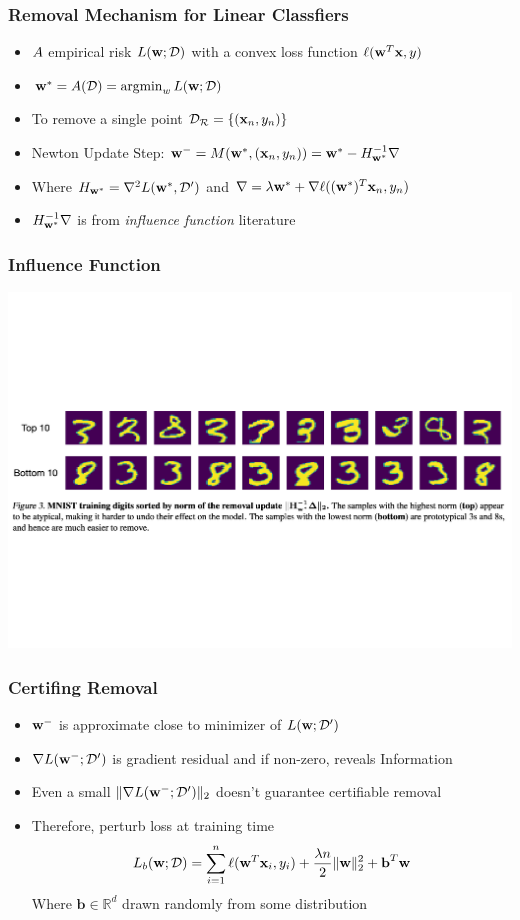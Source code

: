 \documentclass[pdf]{beamer}
\begin{document}
\begin{frame}
  \frametitle{Removal Mechanism for Linear Classfiers}
  \begin{itemize}
    \item $A$ empirical risk $L(\textbf{w};\mathcal{D})$ with a convex loss function $\ell(\textbf{w}^{T}\textbf{x},y)$
    \item $\textbf{w}^{*} = A(\mathcal{D})=\operatorname*{\arg\!\min}_{w}L(\textbf{w};\mathcal{D})$
    \item To remove a single point $\mathcal{D_{R}} = \{(\textbf{x}_{n},y_{n})\}$ 
    \item Newton Update Step: $\textbf{w}^{-}=M(\textbf{w}^{*},(\textbf{x}_{n},y_{n})) = \textbf{w}^{*} - H^{-1}_{\textbf{w}^{*}}\nabla$
    \item Where $H_{\textbf{w}^{*}} = \nabla^{2}L(\textbf{w}^{*},\mathcal{D}^{\prime})$ and $\nabla = \lambda\textbf{w}^{*} + \nabla\ell((\textbf{w}^{*})^{T}\textbf{x}_{n},y_{n})$
    \item $H ^{-1}_{\textbf{w}^{*}}\nabla$ is from \textit{influence function} literature 
  \end{itemize}

\end{frame}

\begin{frame}
  \frametitle{Influence Function}
  \includegraphics[width=\textwidth]{images/influence functions.pdf}
\end{frame}

\begin{frame}
  \frametitle{Certifing Removal}
  \begin{itemize}
    \item $\textbf{w}^{-}$ is approximate close to minimizer of $L(\textbf{w};\mathcal{D}^{\prime})$
    \item $\nabla L(\textbf{w}^{-};\mathcal{D}^{\prime})$ is gradient residual and if non-zero, reveals Information
    \item Even a small $\|\nabla L(\textbf{w}^{-};\mathcal{D}^{\prime})\|_{2}$ doesn't guarantee certifiable removal 
    \item Therefore, perturb loss at training time 
    \[
      L_{b}(\textbf{w};\mathcal{D}) = \sum_{i=1}^{n}\ell(\textbf{w}^{T}\textbf{x}_{i},y_{i})+\frac{\lambda n}{2}\|\textbf{w}\|_{2}^{2} + \textbf{b}^{T}\textbf{w}
    \]
    Where $\textbf{b}\in \mathbb{R}^{d}$ drawn randomly from some distribution
  \end{itemize}

\end{frame}
\end{document}
